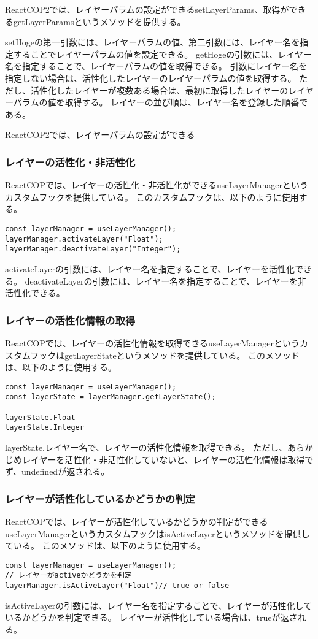 \documentclass{jsarticle}
\begin{document}

ReactCOP2では、レイヤーパラムの設定ができるsetLayerParams、取得ができるgetLayerParamsというメソッドを提供する。

setHogeの第一引数には、レイヤーパラムの値、第二引数には、レイヤー名を指定することでレイヤーパラムの値を設定できる。
getHogeの引数には、レイヤー名を指定することで、レイヤーパラムの値を取得できる。
引数にレイヤー名を指定しない場合は、活性化したレイヤーのレイヤーパラムの値を取得する。
ただし、活性化したレイヤーが複数ある場合は、最初に取得したレイヤーのレイヤーパラムの値を取得する。
レイヤーの並び順は、レイヤー名を登録した順番である。

ReactCOP2では、レイヤーパラムの設定ができる
\subsubsection{レイヤーの活性化・非活性化}
ReactCOPでは、レイヤーの活性化・非活性化ができるuseLayerManagerというカスタムフックを提供している。
このカスタムフックは、以下のように使用する。
\begin{lstlisting}[]
const layerManager = useLayerManager();
layerManager.activateLayer("Float");
layerManager.deactivateLayer("Integer");
\end{lstlisting}
activateLayerの引数には、レイヤー名を指定することで、レイヤーを活性化できる。
deactivateLayerの引数には、レイヤー名を指定することで、レイヤーを非活性化できる。

\subsubsection{レイヤーの活性化情報の取得}
ReactCOPでは、レイヤーの活性化情報を取得できるuseLayerManagerというカスタムフックはgetLayerStateというメソッドを提供している。
このメソッドは、以下のように使用する。
\begin{lstlisting}[]
const layerManager = useLayerManager();
const layerState = layerManager.getLayerState();

layerState.Float
layerState.Integer
\end{lstlisting}
layerState.{レイヤー名}で、レイヤーの活性化情報を取得できる。
ただし、あらかじめレイヤーを活性化・非活性化していないと、レイヤーの活性化情報は取得でず、undefinedが返される。
\subsubsection{レイヤーが活性化しているかどうかの判定}
ReactCOPでは、レイヤーが活性化しているかどうかの判定ができるuseLayerManagerというカスタムフックはisActiveLayerというメソッドを提供している。
このメソッドは、以下のように使用する。
\begin{lstlisting}[]
const layerManager = useLayerManager();
// レイヤーがactiveかどうかを判定
layerManager.isActiveLayer("Float")// true or false
\end{lstlisting}
isActiveLayerの引数には、レイヤー名を指定することで、レイヤーが活性化しているかどうかを判定できる。
レイヤーが活性化している場合は、trueが返される。
\end{document}
